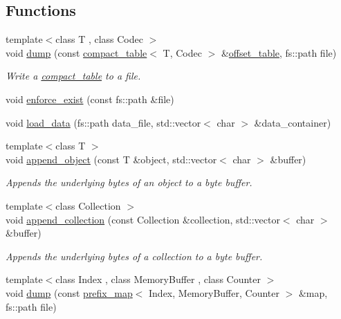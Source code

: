 \subsection*{Functions}
\begin{DoxyCompactItemize}
\item 
{\footnotesize template$<$class T , class Codec $>$ }\\void \mbox{\hyperlink{namespaceirk_1_1io_a7eb5e1bc8d97d131311b0054a1b79b94}{dump}} (const \mbox{\hyperlink{classirk_1_1compact__table}{compact\+\_\+table}}$<$ T, Codec $>$ \&\mbox{\hyperlink{namespaceirk_a3d7b00f359d122e0bf0f709d21f00098}{offset\+\_\+table}}, fs\+::path file)
\begin{DoxyCompactList}\small\item\em Write a {\ttfamily \mbox{\hyperlink{classirk_1_1compact__table}{compact\+\_\+table}}} to a file. \end{DoxyCompactList}\item 
void \mbox{\hyperlink{namespaceirk_1_1io_aa9967d537be4185e88420785431fb63b}{enforce\+\_\+exist}} (const fs\+::path \&file)
\item 
void \mbox{\hyperlink{namespaceirk_1_1io_aa680509002f530048131492dea584724}{load\+\_\+data}} (fs\+::path data\+\_\+file, std\+::vector$<$ char $>$ \&data\+\_\+container)
\item 
{\footnotesize template$<$class T $>$ }\\void \mbox{\hyperlink{namespaceirk_1_1io_a6b56c2c88f08eba5647f662fe701be3c}{append\+\_\+object}} (const T \&object, std\+::vector$<$ char $>$ \&buffer)
\begin{DoxyCompactList}\small\item\em Appends the underlying bytes of an object to a byte buffer. \end{DoxyCompactList}\item 
{\footnotesize template$<$class Collection $>$ }\\void \mbox{\hyperlink{namespaceirk_1_1io_ae89e77960d5da14cd0068835eaa3a442}{append\+\_\+collection}} (const Collection \&collection, std\+::vector$<$ char $>$ \&buffer)
\begin{DoxyCompactList}\small\item\em Appends the underlying bytes of a collection to a byte buffer. \end{DoxyCompactList}\item 
{\footnotesize template$<$class Index , class Memory\+Buffer , class Counter $>$ }\\void \mbox{\hyperlink{namespaceirk_1_1io_a4b74cc5a440f69992ce2302aebfc0b4d}{dump}} (const \mbox{\hyperlink{classirk_1_1prefix__map}{prefix\+\_\+map}}$<$ Index, Memory\+Buffer, Counter $>$ \&map, fs\+::path file)
\end{DoxyCompactItemize}


